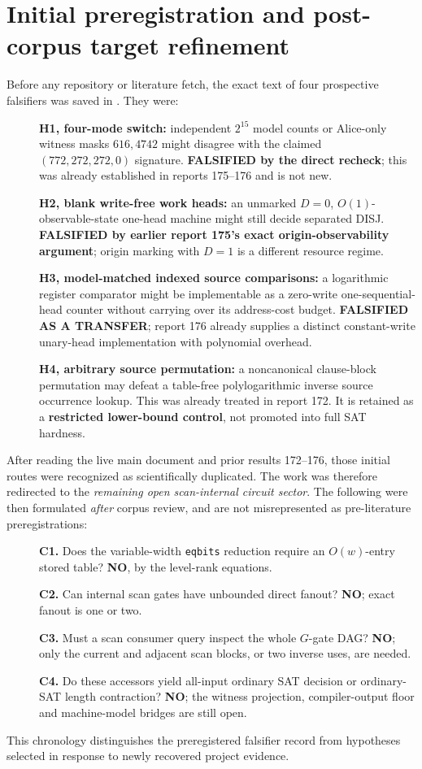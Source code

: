 \documentclass[11pt]{article}
\begin{document}
\section{Initial preregistration and post-corpus target refinement}
Before any repository or literature fetch, the exact text of four prospective
falsifiers was saved in . They were:
\begin{description}
\item[]\textbf{H1, four-mode switch:} independent $2^{15}$ model counts or
Alice-only witness masks $616,4742$ might disagree with the claimed
$(772,272,272,0)$ signature. \textbf{FALSIFIED by the direct recheck};
this was already established in reports 175--176 and is not new.
\item[]\textbf{H2, blank write-free work heads:} an unmarked $D=0$,
$O(1)$-observable-state one-head machine might still decide separated DISJ.
\textbf{FALSIFIED by earlier report 175's exact origin-observability argument};
origin marking with $D=1$ is a different resource regime.
\item[]\textbf{H3, model-matched indexed source comparisons:} a logarithmic
register comparator might be implementable as a zero-write one-sequential-head
counter without carrying over its address-cost budget.
\textbf{FALSIFIED AS A TRANSFER}; report 176 already supplies a distinct
constant-write unary-head implementation with polynomial overhead.
\item[]\textbf{H4, arbitrary source permutation:} a noncanonical clause-block
permutation may defeat a table-free polylogarithmic inverse source occurrence
lookup. This was already treated in report 172. It is retained as a
\textbf{restricted lower-bound control}, not promoted into full SAT hardness.
\end{description}
After reading the live main document and prior results 172--176, those
initial routes were recognized as scientifically duplicated. The work was
therefore redirected to the \emph{remaining open scan-internal circuit sector}.
The following were then formulated \emph{after} corpus review, and are not
misrepresented as pre-literature preregistrations:
\begin{description}
\item[]\textbf{C1.} Does the variable-width \texttt{eqbits} reduction
require an $O(w)$-entry stored table? \textbf{NO}, by the level-rank equations.
\item[]\textbf{C2.} Can internal scan gates have unbounded direct fanout?
\textbf{NO}; exact fanout is one or two.
\item[]\textbf{C3.} Must a scan consumer query inspect the whole $G$-gate DAG?
\textbf{NO}; only the current and adjacent scan blocks, or two inverse uses,
are needed.
\item[]\textbf{C4.} Do these accessors yield all-input ordinary SAT decision
or ordinary-SAT length contraction? \textbf{NO}; the witness projection,
compiler-output floor and machine-model bridges are still open.
\end{description}
This chronology distinguishes the preregistered falsifier record from
hypotheses selected in response to newly recovered project evidence.
\end{document}
